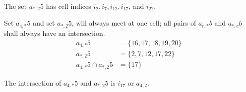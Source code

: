 \documentclass[letterpaper, twoside,12pt]{article}
\begin{document}
    The set $a_{*,2}5$ has cell indices $i_{2}, i_{7}, i_{12}, i_{17}$, and $i_{22}$.

    Set $a_{4,*}5$ and set $a_{*,2}5$, will always meet at one cell; all pairs of $a_{r,*}b$ and $a_{*,c}b$ shall always have an intersection.
    \begin{equation*}
        \begin{split}
            a_{4,*}5 &= \{16, 17, 18, 19, 20 \} \\
            a_{*,2}5 &= \{2, 7, 12, 17, 22 \} \\
            a_{4,*}5 \cap a_{*,2}5 &= \{17\}
        \end{split}
    \end{equation*}

    The intersection of $a_{4,*}5$ and $a_{*,2}5$ is $i_{17}$ or $a_{4,2}$.
\end{document}
